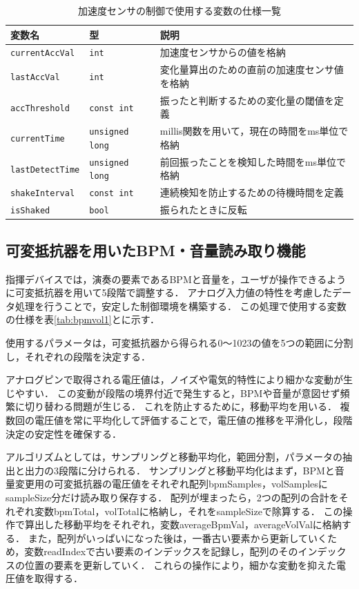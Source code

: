 \documentclass[lualatex,book,paper=a4paper,jafontsize=11.5pt,jafontscale=1.05]{jlreq}
\begin{document}
\begin{table}[H]
  \centering
  \caption{加速度センサの制御で使用する変数の仕様一覧}
  \label{tab:acc}
  \begin{tabular}{llp{6cm}} \hline
    \textbf{変数名} & \textbf{型} & \textbf{説明} \\ \hline
	\texttt{currentAccVal} & \texttt{int} & 加速度センサからの値を格納 \\ \hline
    \texttt{lastAccVal} & \texttt{int}  & 変化量算出のための直前の加速度センサ値を格納 \\\hline
    \texttt{accThreshold} & \texttt{const int}  & 振ったと判断するための変化量の閾値を定義 \\\hline
    \texttt{currentTime} & \texttt{unsigned long}  & millis関数を用いて，現在の時間をms単位で格納 \\ \hline
    \texttt{lastDetectTime} & \texttt{unsigned long}  & 前回振ったことを検知した時間をms単位で格納 \\ \hline
    \texttt{shakeInterval} & \texttt{const int}  & 連続検知を防止するための待機時間を定義 \\ \hline
	\texttt{isShaked} & \texttt{bool}  & 振られたときに反転\\ \hline
  \end{tabular}
\end{table}

\subsection{可変抵抗器を用いたBPM・音量読み取り機能}
指揮デバイスでは，演奏の要素であるBPMと音量を，ユーザが操作できるように可変抵抗器を用いて5段階で調整する．
アナログ入力値の特性を考慮したデータ処理を行うことで，安定した制御環境を構築する．
この処理で使用する変数の仕様を表\ref{tab:bpmvol1}とに示す．

使用するパラメータは，可変抵抗器から得られる0〜1023の値を5つの範囲に分割し，それぞれの段階を決定する．

アナログピンで取得される電圧値は，ノイズや電気的特性により細かな変動が生じやすい．
この変動が段階の境界付近で発生すると，BPMや音量が意図せず頻繁に切り替わる問題が生じる．
これを防止するために，移動平均を用いる．
複数回の電圧値を常に平均化して評価することで，電圧値の推移を平滑化し，段階決定の安定性を確保する．

アルゴリズムとしては，サンプリングと移動平均化，範囲分割，パラメータの抽出と出力の3段階に分けられる．
サンプリングと移動平均化はまず，BPMと音量変更用の可変抵抗器の電圧値をそれぞれ配列bpmSamples，volSamplesにsampleSize分だけ読み取り保存する．
配列が埋まったら，2つの配列の合計をそれぞれ変数bpmTotal，volTotalに格納し，それをsampleSizeで除算する．
この操作で算出した移動平均をそれぞれ，変数averageBpmVal，averageVolValに格納する．
また，配列がいっぱいになった後は，一番古い要素から更新していくため，変数readIndexで古い要素のインデックスを記録し，配列のそのインデックスの位置の要素を更新していく．
これらの操作により，細かな変動を抑えた電圧値を取得する．
\end{document}
